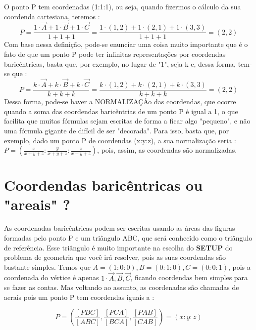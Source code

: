 \documentclass{article}
\begin{document}
O ponto P tem coordenadas (1:1:1), ou seja, quando fizermos o cálculo da sua coordenda cartesiana, teremos : 
$$
P = \frac{1 \cdot \overrightarrow{A} + 1\cdot \overrightarrow{B} + 1 \cdot \overrightarrow{C}}{1+1+1} = \frac{1 \cdot (1,2) + 1 \cdot (2,1) + 1 \cdot (3,3)}{1+1+1} = (2,2)
$$
Com base nessa definição, pode-se enunciar uma coisa muito importante que é o fato de que um ponto P pode ter infinitas representações por coordendas baricêntricas, basta que, por exemplo, no lugar de "1", seja k e, dessa forma, tem-se que :
$$
P = \frac{k \cdot \overrightarrow{A} + k\cdot \overrightarrow{B} + k \cdot \overrightarrow{C}}{k+k+k} = \frac{k \cdot (1,2) + k \cdot (2,1) + k \cdot (3,3)}{k+k+k} = (2,2)
$$
Dessa forma, pode-se haver a NORMALIZAÇÂo das coordendas, que ocorre quando a soma das coordendas baricêntrias de um ponto P é igual a 1, o que facilita que muitas fórmulas sejam escritas de forma a ficar algo "pequeno", e não uma fórmula gigante de difícil de ser "decorada". Para isso, basta que, por exemplo, dado um ponto P de coordendas (x:y:z), a  sua normalização seria : $P = (\frac{x}{x+y+z}  : \frac{y}{x+y+z} : \frac{z}{x+y+z})$, pois, assim, as coordendas são normalizadas.
\section{Coordendas baricêntricas ou "areais" ?}

As coordenadas baricêntricas podem ser escritas usando as áreas das figuras formadas pelo ponto P e um triângulo ABC, que será conhecido como o triângulo de referência. Esse triângulo é muito importante na escolha do \textbf{SETUP} do problema de geometria que você  irá resolver, pois as suas coordendas são bastante simples. Temos  que $A  = (1:0:0), B = (0:1:0), C = (0:0:1)$, pois a coordenada do vértice é apenas $1 \cdot \overrightarrow{A},\overrightarrow{B},\overrightarrow{C}$, ficando coordendas bem simples para se fazer as contas. Mas voltando ao assunto, as coordenadas são chamadas de aerais pois um ponto P tem coordendas iguais a :

$$
P = (\frac{[PBC]}{[ABC]}, \frac{[PCA]}{[BCA]}, \frac{[PAB]}{[CAB]}) = (x:y:z)
$$
\end{document}
